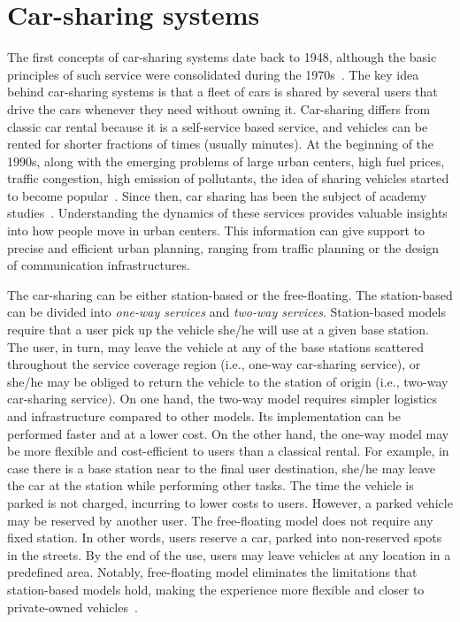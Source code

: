 \section{Car-sharing systems} 
\label{sec:3_2_carsharing}

The first concepts of car-sharing systems date back to 1948, although the basic principles of such service were consolidated during the 1970s~\cite{harms1998emergence}.  The key idea behind car-sharing systems is that a fleet of cars is shared by several users that drive the cars whenever they need without owning it. Car-sharing differs from classic car rental because it is a self-service based service, and vehicles can be rented for shorter fractions of times (usually minutes). 
At the beginning of the 1990s, along with the emerging problems of large urban centers, high fuel prices, traffic congestion, high emission of pollutants, the idea of sharing vehicles started to become popular~\cite{becker2017comparing}. Since then, car sharing has been the subject of academy studies~\cite{millard2005car}. Understanding the dynamics of these services provides valuable insights into how people move in urban centers. This information can give support to precise and efficient urban planning, ranging from traffic planning or the design of communication infrastructures.

The car-sharing can be either station-based or the free-floating. The station-based can be divided into \textit{one-way services} and \textit{two-way services}. Station-based models require that a user pick up the vehicle she/he will use at a given base station. The user, in turn, may leave the vehicle at any of the base stations scattered throughout the service coverage region (i.e., one-way car-sharing service), or she/he may be obliged to return the vehicle to the station of origin (i.e., two-way car-sharing service). On one hand, the two-way model requires simpler logistics and infrastructure compared to other models. Its implementation can be performed faster and at a lower cost. 
On the other hand, the one-way model may be more flexible and cost-efficient to users than a classical rental. For example, in case there is a base station near to the final user destination, she/he may leave the car at the station while performing other tasks. The time the vehicle is parked is not charged, incurring to lower costs to users. However, a parked vehicle may be reserved by another user. 
The free-floating model does not require any fixed station. In other words, users reserve a car, parked into non-reserved spots in the streets. By the end of the use, users may leave vehicles at any location in a predefined area. Notably, free-floating model eliminates the limitations that station-based models hold, making the experience more flexible and closer to private-owned vehicles~\cite{ciari2014modeling}.

